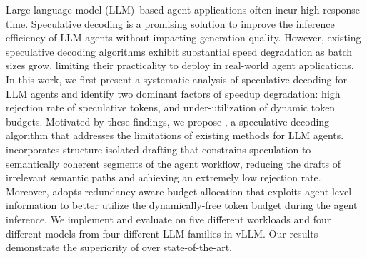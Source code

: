 Large language model (LLM)–based agent applications often incur high response time. Speculative decoding is a promising solution to improve the inference efficiency of LLM agents without impacting generation quality. 
%
However, existing speculative decoding algorithms exhibit substantial speed degradation as batch sizes grow, limiting their practicality to deploy in real-world agent applications.
%
In this work, we first present a systematic analysis of speculative decoding for LLM agents and identify two dominant factors of speedup degradation: high rejection rate of speculative tokens, and under-utilization of dynamic token budgets.
%
Motivated by these findings, we propose \sysname, a speculative decoding algorithm that addresses the limitations of existing methods for LLM agents. \sysname incorporates structure-isolated drafting that constrains speculation to semantically coherent segments of the agent workflow, reducing the drafts of irrelevant semantic paths and achieving an extremely low rejection rate. Moreover, \sysname adopts redundancy-aware budget allocation that exploits agent-level information to better utilize the dynamically-free token budget during the agent inference.
%
We implement and evaluate \sysname on five different workloads and four different models from four different LLM families in vLLM. Our results demonstrate the superiority of \sysname over state-of-the-art.
%
